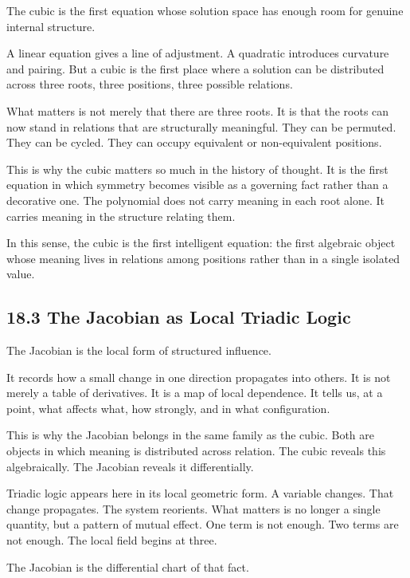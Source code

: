 \documentclass[
]{article}
\begin{document}
The cubic is the first equation whose solution space has enough room for
genuine internal structure.

A linear equation gives a line of adjustment. A quadratic introduces
curvature and pairing. But a cubic is the first place where a solution
can be distributed across three roots, three positions, three possible
relations.

What matters is not merely that there are three roots. It is that the
roots can now stand in relations that are structurally meaningful. They
can be permuted. They can be cycled. They can occupy equivalent or
non-equivalent positions.

This is why the cubic matters so much in the history of thought. It is
the first equation in which symmetry becomes visible as a governing fact
rather than a decorative one. The polynomial does not carry meaning in
each root alone. It carries meaning in the structure relating them.

In this sense, the cubic is the first intelligent equation: the first
algebraic object whose meaning lives in relations among positions rather
than in a single isolated value.

\hypertarget{the-jacobian-as-local-triadic-logic}{%
\subsection{18.3 The Jacobian as Local Triadic
Logic}\label{the-jacobian-as-local-triadic-logic}}

The Jacobian is the local form of structured influence.

It records how a small change in one direction propagates into others.
It is not merely a table of derivatives. It is a map of local
dependence. It tells us, at a point, what affects what, how strongly,
and in what configuration.

This is why the Jacobian belongs in the same family as the cubic. Both
are objects in which meaning is distributed across relation. The cubic
reveals this algebraically. The Jacobian reveals it differentially.

Triadic logic appears here in its local geometric form. A variable
changes. That change propagates. The system reorients. What matters is
no longer a single quantity, but a pattern of mutual effect. One term is
not enough. Two terms are not enough. The local field begins at three.

The Jacobian is the differential chart of that fact.
\end{document}
